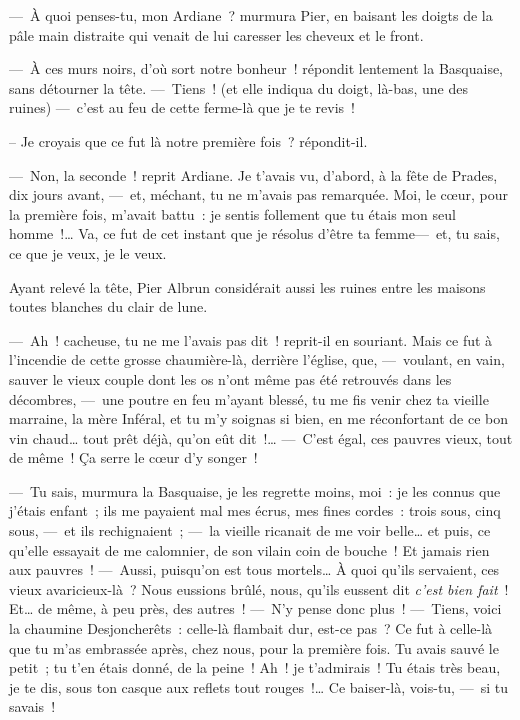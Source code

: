 \documentclass[french,twoside]{book} %
\begin{document}
— À quoi penses-tu, mon Ardiane ? murmura Pier, en baisant les doigts de la pâle main distraite qui venait de lui caresser les cheveux et le front.\par
— À ces murs noirs, d’où sort notre bonheur ! répondit lentement la Basquaise, sans détourner la tête. — Tiens ! (et elle indiqua du doigt, là-bas, une des ruines) — c’est au feu de cette ferme-là que je te revis !\par
   – Je croyais que ce fut là notre première fois ? répondit-il.\par
— Non, la seconde ! reprit Ardiane. Je t’avais vu, d’abord, à la fête de Prades, dix jours avant, — et, méchant, tu ne m’avais pas remarquée. Moi, le cœur, pour la première fois, m’avait battu : je sentis follement que tu étais mon seul homme !… Va, ce fut de cet instant que je résolus d’être ta femme— et, tu sais, ce que je veux, je le veux.\par
Ayant relevé la tête, Pier Albrun considérait aussi les ruines entre les maisons toutes blanches du clair de lune.\par
— Ah ! cacheuse, tu ne me l’avais pas dit ! reprit-il en souriant. Mais ce fut à l’incendie de cette grosse chaumière-là, derrière l’église, que, — voulant, en vain, sauver le vieux couple dont les os n’ont même pas été retrouvés dans les décombres, — une poutre en feu m’ayant blessé, tu me fis venir chez ta vieille marraine, la mère Inféral, et tu m’y soignas si bien, en me réconfortant de ce bon vin chaud… tout prêt déjà, qu’on eût dit !… — C’est égal, ces pauvres   vieux, tout de même ! Ça serre le cœur d’y songer !\par
— Tu sais, murmura la Basquaise, je les regrette moins, moi : je les connus que j’étais enfant ; ils me payaient mal mes écrus, mes fines cordes : trois sous, cinq sous, — et ils rechignaient ; — la vieille ricanait de me voir belle… et puis, ce qu’elle essayait de me calomnier, de son vilain coin de bouche ! Et jamais rien aux pauvres ! — Aussi, puisqu’on est tous mortels… À quoi qu’ils servaient, ces vieux avaricieux-là ? Nous eussions brûlé, nous, qu’ils eussent dit \emph{c’est bien fait} ! Et… de même, à peu près, des autres ! — N’y pense donc plus ! — Tiens, voici la chaumine Desjoncherêts : celle-là flambait dur, est-ce pas ? Ce fut à celle-là que tu m’as embrassée après, chez nous, pour la première fois. Tu avais sauvé le petit ; tu t’en étais donné, de la peine ! Ah ! je t’admirais ! Tu étais très beau, je te dis, sous ton casque aux reflets tout rouges !… Ce baiser-là, vois-tu, — si tu savais !\par
\end{document}
